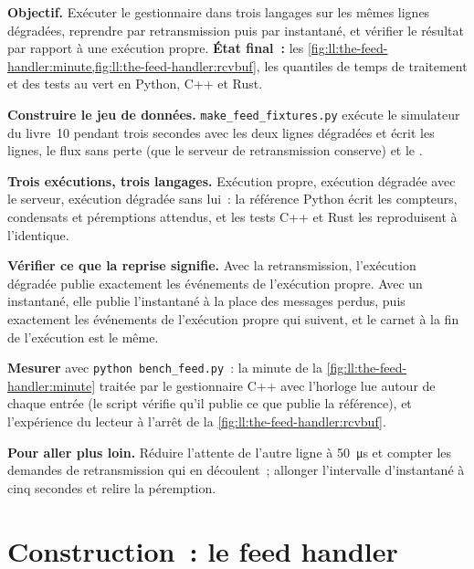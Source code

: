 \begin{tutorial}
\textbf{Objectif.} Exécuter le gestionnaire dans trois langages sur les mêmes lignes dégradées, reprendre par retransmission puis par instantané, et
vérifier le résultat par rapport à une exécution propre. \textbf{État final~:} les \cref{fig:ll:the-feed-handler:minute,fig:ll:the-feed-handler:rcvbuf},
les quantiles de temps de traitement et des tests au vert en Python, C++ et Rust.
\begin{tutsteps}
\item \textbf{Construire le jeu de données.} \texttt{make\_feed\_fixtures.py} exécute le simulateur du livre~10 pendant trois secondes avec les deux lignes
dégradées et écrit les lignes, le flux sans perte (que le serveur de retransmission conserve) et le .
\item \textbf{Trois exécutions, trois langages.} Exécution propre, exécution dégradée avec le serveur, exécution dégradée sans lui~: la référence Python écrit
les compteurs, condensats et péremptions attendus, et les tests C++ et Rust les reproduisent à l'identique.
\item \textbf{Vérifier ce que la reprise signifie.} Avec la retransmission, l'exécution dégradée publie exactement les événements de l'exécution propre. Avec
un instantané, elle publie l'instantané à la place des messages perdus, puis exactement les événements de l'exécution propre qui suivent, et le carnet
à la fin de l'exécution est le même.
\item \textbf{Mesurer} avec \texttt{python bench\_feed.py}~: la minute de la \cref{fig:ll:the-feed-handler:minute} traitée par le
gestionnaire C++ avec l'horloge lue autour de chaque entrée (le script vérifie qu'il publie ce que publie la référence), et
l'expérience du lecteur à l'arrêt de la \cref{fig:ll:the-feed-handler:rcvbuf}.
\end{tutsteps}
\textbf{Pour aller plus loin.} Réduire l'attente de l'autre ligne à \qty{50}{\micro\second} et compter les demandes de retransmission
qui en découlent~; allonger l'intervalle d'instantané à cinq secondes et relire la péremption.
\end{tutorial}

\section{Construction~: le feed handler}\label{bld:ll:the-feed-handler:feedhandler}

